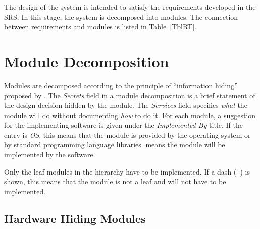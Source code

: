 \documentclass[12pt, titlepage]{article}
\begin{document}
The design of the system is intended to satisfy the requirements developed in
the SRS. In this stage, the system is decomposed into modules. The connection
between requirements and modules is listed in Table~\ref{TblRT}.

\section{Module Decomposition} \label{SecMD}

Modules are decomposed according to the principle of ``information hiding''
proposed by \citet{ParnasEtAl1984}. The \emph{Secrets} field in a module
decomposition is a brief statement of the design decision hidden by the
module. The \emph{Services} field specifies \emph{what} the module will do
without documenting \emph{how} to do it. For each module, a suggestion for the
implementing software is given under the \emph{Implemented By} title. If the
entry is \emph{OS}, this means that the module is provided by the operating
system or by standard programming language libraries.  \emph{\progname{}} means the
module will be implemented by the \progname{} software.

Only the leaf modules in the hierarchy have to be implemented. If a dash
(\emph{--}) is shown, this means that the module is not a leaf and will not have
to be implemented.

\subsection{Hardware Hiding Modules \label{Hardware Hiding Modules}}
\end{document}
